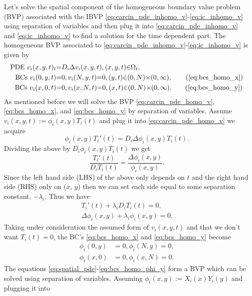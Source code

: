 \documentclass[\main/thesis.tex]{subfiles}
\begin{document}
Let's solve the spatial component of the homogeneous boundary value problem (BVP) associated with the IBVP \eqref{eq:carcin_pde_inhomo_v}-\eqref{eq:ic_inhomo_v} using separation of variables and then 
plug it into \eqref{eq:carcin_pde_inhomo_v} and \eqref{eq:ic_inhomo_v} to find a solution for the time dependent part.
The homogeneous BVP associated to \eqref{eq:carcin_pde_inhomo_v}-\eqref{eq:ic_inhomo_v} is given by
\begin{align}
\text{PDE } v_i(x, y, t)_t &{=} D_i \Delta v_i(x, y, t), (x, y, t) {\in} \Omega_t,
\label{eq:carcin_pde_homo_v} \\
\text{BCs } v_i(0, y, t) &{=} 0, v_i(N, y, t) {=} 0, (y, t) {\in} (0, N) {\times} (0, \infty), \tag{\ref{eq:bcs_homo_x}} \\
\text{BCs } v_i(x, 0, t) &{=} 0, v_i(x, N, t) {=} 0, (x, t) {\in} (0, N) {\times} (0, \infty). \tag{\ref{eq:bcs_homo_y}} 
\end{align}
As mentioned before we will solve the BVP \eqref{eq:carcin_pde_homo_v}, \eqref{eq:bcs_homo_x}, and \eqref{eq:bcs_homo_y} by separation of variables. Assume $v_i(x, y, t) {:=} \phi_i(x, y)T_i(t)$ and 
plug it into \eqref{eq:carcin_pde_homo_v} we acquire
\begin{equation*}
\phi_i(x, y)T_i'(t) {=} D_i\Delta \phi_i(x, y)T_i(t).
\end{equation*}
Dividing the above by $D_i\phi_i(x, y)T_i(t)$ we get
\begin{equation*}
\frac{T_i'(t)}{D_iT_i(t)} {=} \frac{\Delta \phi_i(x, y)}{\phi_i(x, y)}.
\end{equation*}
Since the left hand side (LHS) of the above only depends on $t$ and the right hand side (RHS) only on ($x$, $y$) then we can set each side equal to some separation constant, $\minus \lambda_i$.
Thus we have
\begin{align}
T_i'(t) {+} \lambda_i D_i T_i(t) {=} 0, \nonumber \\
\Delta \phi_i(x, y) {+} \lambda_i \phi_i(x, y) {=} 0.
\label{eq:spatial_pde}
\end{align}
Taking under consideration the assumed form of $v_i(x, y, t)$ and that we don't want $T_i(t) {=} 0$, the BC's \eqref{eq:bcs_homo_x} and \eqref{eq:bcs_homo_y} become
\begin{align}
\phi_i(0, y) &{=} 0, \phi_i(N, y) {=} 0,
\label{eq:bcs_homo_phi_x} \\
\phi_i(x, 0) &{=} 0, \phi_i(x, N) {=} 0.
\label{eq:bcs_homo_phi_y}
\end{align}
The equations \eqref{eq:spatial_pde}-\eqref{eq:bcs_homo_phi_y} form a BVP which can be solved using separation of variables. Assuming $\phi_i(x, y) {:=} X_i(x)Y_i(y)$ and plugging it into 
\end{document}
